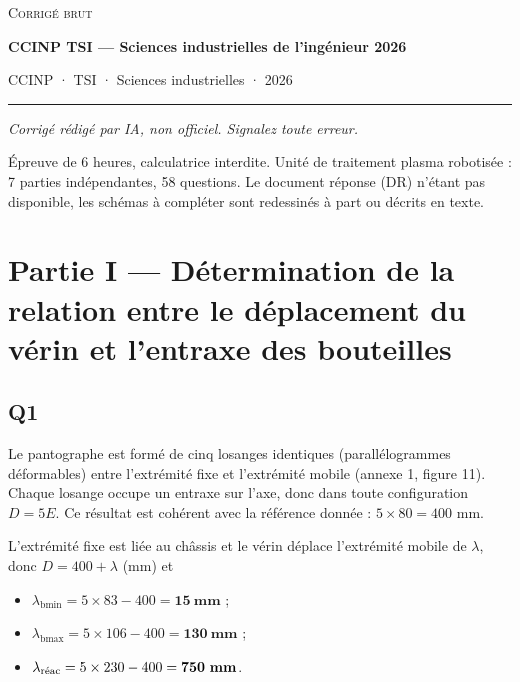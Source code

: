 \documentclass[11pt,a4paper]{article}
\providecommand{\tightlist}{\setlength{\itemsep}{0pt}\setlength{\parskip}{0pt}}
\newcommand{\equationajustee}[1]{%
  \sbox{\boiteequation}{$\displaystyle #1$}%
  \ifdim\wd\boiteequation>\linewidth
    \[\resizebox{\linewidth}{!}{\usebox{\boiteequation}}\]%
  \else
    \[#1\]%
  \fi}
\begin{document}
\thispagestyle{plain}
\begin{center}
  {\small\scshape Corrigé brut}\par\smallskip
  {\LARGE\bfseries CCINP TSI — Sciences industrielles de l'ingénieur 2026\par}\medskip
  {\large CCINP · TSI · Sciences industrielles · 2026\par}
\end{center}
\vspace{2pt}\hrule\vspace{8pt}

\emph{Corrigé rédigé par IA, non officiel. Signalez toute erreur.}

Épreuve de 6 heures, calculatrice interdite. Unité de traitement plasma robotisée : 7 parties indépendantes, 58 questions. Le document réponse (DR) n'étant pas disponible, les schémas à compléter sont redessinés à part ou décrits en texte.

\hypertarget{partie-i-duxe9termination-de-la-relation-entre-le-duxe9placement-du-vuxe9rin-et-lentraxe-des-bouteilles}{%
\section{Partie I --- Détermination de la relation entre le déplacement du vérin et l'entraxe des bouteilles}\label{partie-i-duxe9termination-de-la-relation-entre-le-duxe9placement-du-vuxe9rin-et-lentraxe-des-bouteilles}}

\hypertarget{q1}{%
\subsection{Q1}\label{q1}}

Le pantographe est formé de cinq losanges identiques (parallélogrammes déformables) entre l'extrémité fixe et l'extrémité mobile (annexe 1, figure 11). Chaque losange occupe un entraxe sur l'axe, donc dans toute configuration \(D=5E\). Ce résultat est cohérent avec la référence donnée : \(5\times80=400\) mm.

L'extrémité fixe est liée au châssis et le vérin déplace l'extrémité mobile de \(\lambda\), donc \(D=400+\lambda\) (mm) et

\equationajustee{\boxed{\lambda=5E-400\quad(\text{mm})}}

\begin{itemize}
\tightlist
\item
  \(\lambda_{\text{bmin}}=5\times83-400=\mathbf{15\ mm}\) ;
\item
  \(\lambda_{\text{bmax}}=5\times106-400=\mathbf{130\ mm}\) ;
\item
  \(\lambda_{\text{\text{réac}}}=5\times230-400=\mathbf{750\ mm}\).
\end{itemize}
\end{document}

